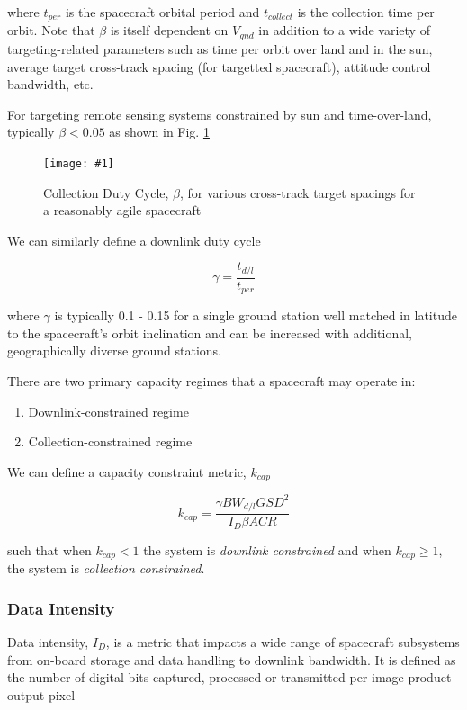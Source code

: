 \documentclass[10pt,journal]{IEEEtran}  %
\newcommand{\includefigure}[3]
{
  \begin{figure}[h!]
  \centering
  \texttt{[image: \#1]}
  \caption[]{#3}
  \label{#2}
  \end{figure}
}
\begin{document}
where $t_{per}$ is the spacecraft orbital period and $t_{collect}$ is the collection time per orbit.  Note that $\beta$ is itself dependent on $V_{gnd}$ in addition to a wide variety of targeting-related parameters such as time per orbit over land and in the sun, average target cross-track spacing (for targetted spacecraft), attitude control bandwidth, etc.

For targeting remote sensing systems constrained by sun and time-over-land, typically $\beta < 0.05$ as shown in Fig. \ref{fig:beta}

\includefigure{figures/collection_dc.pgf}{fig:beta}{Collection Duty Cycle, $\beta$, for various cross-track target spacings for a reasonably agile spacecraft}

We can similarly define a downlink duty cycle

\begin{equation}
    \gamma = \frac{t_{d/l}}{t_{per}}
\end{equation}

where $\gamma$ is typically 0.1 - 0.15 for a single ground station well matched in latitude to the spacecraft's orbit inclination and can be increased with additional, geographically diverse ground stations.

There are two primary capacity regimes that a spacecraft may operate in:

\begin{enumerate}
\item Downlink-constrained regime
\item Collection-constrained regime
\end{enumerate}

We can define a capacity constraint metric, $k_{cap}$

\begin{equation}
k_{cap} = \frac{\gamma BW_{d/l} GSD^2}{I_D \beta ACR}
\end{equation}

such that when $k_{cap} < 1$ the system is \emph{downlink constrained} and when $k_{cap} \geq 1$, the system is \emph{collection constrained}.


\subsubsection{Data Intensity}

Data intensity, $I_D$, is a metric that impacts a wide range of spacecraft subsystems from on-board storage and data handling to downlink bandwidth.  It is defined as the number of digital bits captured, processed or transmitted per image product output pixel
\end{document}
